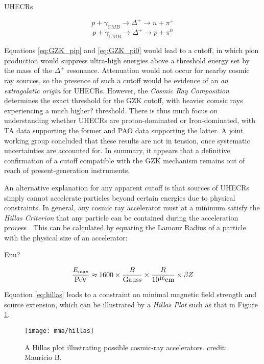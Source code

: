 UHECRs

\begin{equation}
p + \gamma_{CMB} \rightarrow \Delta^{+} \rightarrow n + \pi^{+}
\label{eq:GZK_pip}
\end{equation}
\begin{equation}
p + \gamma_{CMB} \rightarrow \Delta^{+} \rightarrow p + \pi^{0}
\label{eq:GZK_pi0}
\end{equation}

Equations \ref{eq:GZK_pip} and \ref{eq:GZK_pi0} would lead to a cutoff, in which pion production would suppress ultra-high energies above a threshold energy set by the mass of the $\Delta^{+}$ resonance. Attenuation would not occur for nearby cosmic ray sources, so the presence of such a cutoff would be evidence of an \emph{an extragalatic origin} for UHECRs. However, the \emph{Cosmic Ray Composition} determines the exact threshold for the GZK cutoff, with heavier comsic rays experiencing a much higher? threshold. There is thus much focus on understanding whether UHECRs are proton-dominated or Iron-dominated, with TA data supporting the former and PAO data supporting the latter. A joint working group concluded that these results are not in tension, once systematic uncertainties are accounted for. In summary, it appears that a definitive confirmation of a cutoff compatible with the GZK mechanism remains out of reach of present-generation instruments.

An alternative explanation for any apparent cutoff is that sources of UHECRs simply cannot accelerate particles beyond certain energies due to physical constraints. In general, any cosmic ray accelerator must at a minimum satisfy the \emph{Hillas Criterion} that any particle can be contained during the acceleration process . This can be calculated by equating the Lamour Radius of a particle with the physical size of an accelerator:

Enu?

\begin{equation}
\frac{E_{\textup{max}}}{\textup{PeV}} \approx
1600 \times \frac{B}{\textup{Gauss}} \times \frac{R}{10^{16} \textup{cm}} \times
\beta Z
\label{eq:hillas}
\end{equation}

Equation \ref{eq:hillas} leads to a constraint on minimal magnetic field strength and source extension, which can be illustrated by a \emph{Hillas Plot} such as that in Figure \ref{fig:hillas_plot}. 

\begin{figure}[!ht]
	\centering \texttt{[image: mma/hillas]}
	\caption{A Hillas plot illustrating possible cosmic-ray accelerators. credit: Mauricio B.}
	\label{fig:hillas_plot}
\end{figure}


